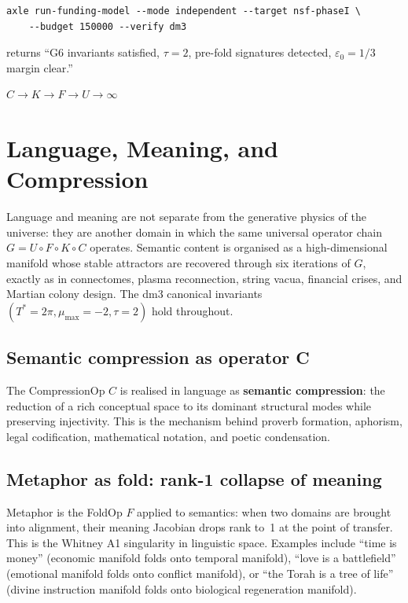 \begin{verbatim}
axle run-funding-model --mode independent --target nsf-phaseI \
    --budget 150000 --verify dm3
\end{verbatim}
returns ``G6 invariants satisfied, \(\tau=2\), pre-fold signatures detected, \(\varepsilon_0=1/3\) margin clear.''

$C \to K \to F \to U \to \infty$

\chapter{Language, Meaning, and Compression}

Language and meaning are not separate from the generative physics of the universe: they are another domain in which the same universal operator chain $G = U \circ F \circ K \circ C$ operates. Semantic content is organised as a high-dimensional manifold whose stable attractors are recovered through six iterations of \(G\), exactly as in connectomes, plasma reconnection, string vacua, financial crises, and Martian colony design. The dm3 canonical invariants $(T^* = 2\pi, \mu_{\max} = -2, \tau = 2)$ hold throughout.

\section{Semantic compression as operator C}

The CompressionOp \(C\) is realised in language as \textbf{semantic compression}: the reduction of a rich conceptual space to its dominant structural modes while preserving injectivity. This is the mechanism behind proverb formation, aphorism, legal codification, mathematical notation, and poetic condensation.

\section{Metaphor as fold: rank-1 collapse of meaning}

Metaphor is the FoldOp \(F\) applied to semantics: when two domains are brought into alignment, their meaning Jacobian drops rank to~1 at the point of transfer. This is the Whitney A1 singularity in linguistic space. Examples include ``time is money'' (economic manifold folds onto temporal manifold), ``love is a battlefield'' (emotional manifold folds onto conflict manifold), or ``the Torah is a tree of life'' (divine instruction manifold folds onto biological regeneration manifold).

